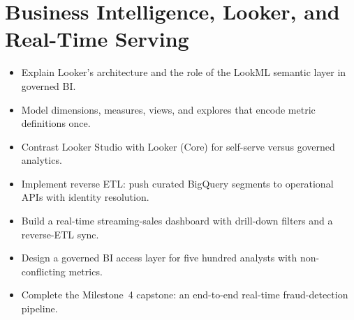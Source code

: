 \chapter{Business Intelligence, Looker, and Real-Time Serving}

\begin{objectives}
\begin{itemize}
    \item Explain Looker's architecture and the role of the LookML semantic layer in governed BI.
    \item Model dimensions, measures, views, and explores that encode metric definitions once.
    \item Contrast Looker Studio with Looker (Core) for self-serve versus governed analytics.
    \item Implement reverse ETL: push curated BigQuery segments to operational APIs with identity resolution.
    \item Build a real-time streaming-sales dashboard with drill-down filters and a reverse-ETL sync.
    \item Design a governed BI access layer for five hundred analysts with non-conflicting metrics.
    \item Complete the Milestone~4 capstone: an end-to-end real-time fraud-detection pipeline.
\end{itemize}
\end{objectives}

